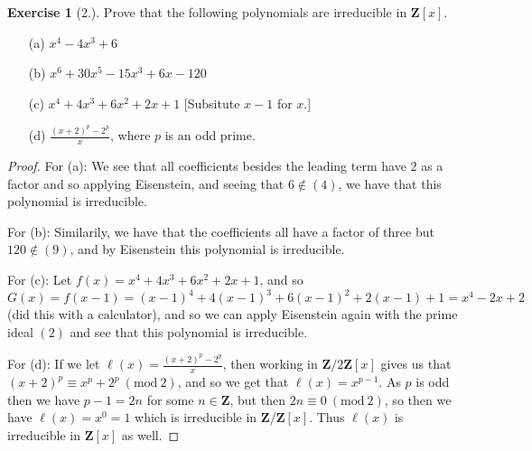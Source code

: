 \documentclass[9pt,reqno]{amsart}
\theoremstyle{definition}
\newtheorem{exercise}{Exercise}[section]
\newcommand{\zz}{\mathbf Z}
\newcommand{\Mod}[1]{\ (\mathrm{mod}\ #1)}
\begin{document}
\begin{exercise}[2.] Prove that the following polynomials are irreducible in $\zz[x]$.
\begin{itemize}
	\item[(a)] $x^4 - 4x^3 + 6$
	\item[(b)] $x^6 + 30x^5 -15x^3 + 6x -120$
	\item[(c)] $x^4 + 4x^3 + 6x^2 + 2x+ 1$ [Subsitute $x-1$ for $x$.]
	\item[(d)] $\frac{(x+2)^p -2^p}{x}$, where $p$ is an odd prime. 
\end{itemize}
	\begin{proof}
		For (a): We see that all coefficients besides the leading term have $2$ as a factor and so applying Eisenstein, and seeing that $6 \notin (4)$, we have that this polynomial is irreducible.
		
		
		For (b): Similarily, we have that the coefficients all have a factor of three but $120 \notin (9)$, and by Eisenstein this polynomial is irreducible. 
		
		For (c): Let $f(x) = x^4 + 4x^3 + 6x^2 +2x +1$, and so $G(x) = f(x-1) = (x-1)^4 + 4(x-1)^3 + 6(x-1)^2 +2(x-1) + 1 = x^4-2x+2$ (did this with a calculator), and so we can apply Eisenstein again with the prime ideal $(2)$ and see that this polynomial is irreducible.
		
		For (d): If we let $\ell (x) = \frac{(x+2)^p-2^p}{x}$, then working in $\zz/2\zz [x]$ gives us that $(x+2)^p \equiv x^p + 2^p \Mod{2}$, and so we get that $\ell (x) = x^{p-1}$. As $p$ is odd then we have $p-1 = 2n$ for some $n \in \zz$, but then $2n \equiv 0 \Mod{2}$, so then we have $\ell (x) = x^0 = 1$ which is irreducible in $\zz/ \zz [x]$. Thus $\ell(x)$ is irreducible in $\zz[x]$ as well. 
		
		\end{proof}
\end{exercise}
\end{document}
